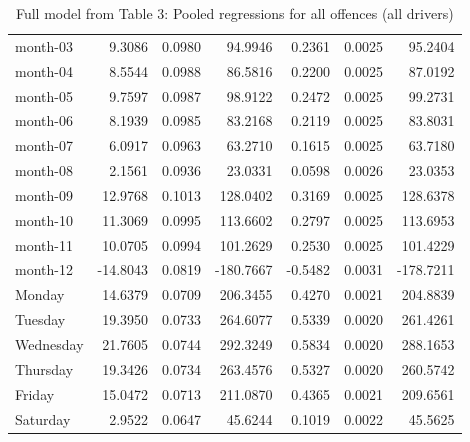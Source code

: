 \documentclass[10pt]{article}
\begin{document}
\begin{table}[ht]
\begin{tabular}{lrrrrrr}
  month-03 & 9.3086 & 0.0980 & 94.9946 & 0.2361 & 0.0025 & 95.2404 \\ 
  month-04 & 8.5544 & 0.0988 & 86.5816 & 0.2200 & 0.0025 & 87.0192 \\ 
  month-05 & 9.7597 & 0.0987 & 98.9122 & 0.2472 & 0.0025 & 99.2731 \\ 
  month-06 & 8.1939 & 0.0985 & 83.2168 & 0.2119 & 0.0025 & 83.8031 \\ 
  month-07 & 6.0917 & 0.0963 & 63.2710 & 0.1615 & 0.0025 & 63.7180 \\ 
  month-08 & 2.1561 & 0.0936 & 23.0331 & 0.0598 & 0.0026 & 23.0353 \\ 
  month-09 & 12.9768 & 0.1013 & 128.0402 & 0.3169 & 0.0025 & 128.6378 \\ 
  month-10 & 11.3069 & 0.0995 & 113.6602 & 0.2797 & 0.0025 & 113.6953 \\ 
  month-11 & 10.0705 & 0.0994 & 101.2629 & 0.2530 & 0.0025 & 101.4229 \\ 
  month-12 & -14.8043 & 0.0819 & -180.7667 & -0.5482 & 0.0031 & -178.7211 \\ 
  Monday & 14.6379 & 0.0709 & 206.3455 & 0.4270 & 0.0021 & 204.8839 \\ 
  Tuesday & 19.3950 & 0.0733 & 264.6077 & 0.5339 & 0.0020 & 261.4261 \\ 
  Wednesday & 21.7605 & 0.0744 & 292.3249 & 0.5834 & 0.0020 & 288.1653 \\ 
  Thursday & 19.3426 & 0.0734 & 263.4576 & 0.5327 & 0.0020 & 260.5742 \\ 
  Friday & 15.0472 & 0.0713 & 211.0870 & 0.4365 & 0.0021 & 209.6561 \\ 
  Saturday & 2.9522 & 0.0647 & 45.6244 & 0.1019 & 0.0022 & 45.5625 \\ 
   \hline
\end{tabular}
\caption{Full model from Table 3: Pooled regressions for all offences (all drivers)} 
\label{tab_3_all_pts_no_age_A}
\end{table}


\clearpage
\pagebreak



\end{document}
